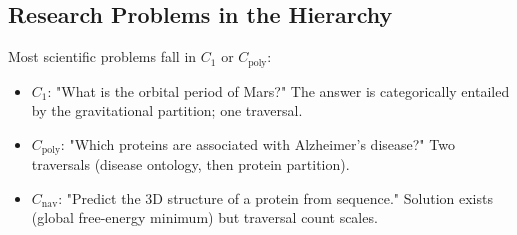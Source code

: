 \documentclass[twocolumn,11pt,a4paper]{article}
\begin{document}
\subsection{Research Problems in the Hierarchy}

Most scientific problems fall in $C_1$ or $C_{\text{poly}}$:
\begin{itemize}[leftmargin=*,itemsep=1pt]
\item $C_1$: "What is the orbital period of Mars?" The answer is categorically entailed by the gravitational partition; one traversal.
\item $C_{\text{poly}}$: "Which proteins are associated with Alzheimer's disease?" Two traversals (disease ontology, then protein partition).
\item $C_{\text{nav}}$: "Predict the 3D structure of a protein from sequence." Solution exists (global free-energy minimum) but traversal count scales.
\end{itemize}
\end{document}
